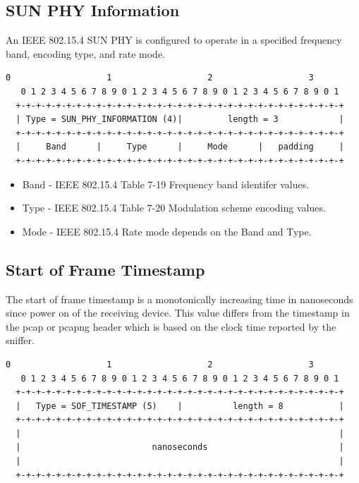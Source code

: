\documentclass[12pt]{article}
\renewcommand\_{\textunderscore\allowbreak}
\begin{document}
\subsection{SUN PHY Information}

An IEEE 802.15.4 SUN PHY is configured to operate in a specified frequency
band, encoding type, and rate mode.

\begin{Verbatim}[samepage=true]
   0                   1                   2                   3
   0 1 2 3 4 5 6 7 8 9 0 1 2 3 4 5 6 7 8 9 0 1 2 3 4 5 6 7 8 9 0 1
  +-+-+-+-+-+-+-+-+-+-+-+-+-+-+-+-+-+-+-+-+-+-+-+-+-+-+-+-+-+-+-+-+
  | Type = SUN_PHY_INFORMATION (4)|         length = 3            |
  +-+-+-+-+-+-+-+-+-+-+-+-+-+-+-+-+-+-+-+-+-+-+-+-+-+-+-+-+-+-+-+-+
  |     Band      |     Type      |     Mode      |   padding     |
  +-+-+-+-+-+-+-+-+-+-+-+-+-+-+-+-+-+-+-+-+-+-+-+-+-+-+-+-+-+-+-+-+
\end{Verbatim}

\begin{itemize}
    \item Band - IEEE 802.15.4 Table 7-19 Frequency band identifer values.
    \item Type - IEEE 802.15.4 Table 7-20 Modulation scheme encoding values.
    \item Mode - IEEE 802.15.4 Rate mode depends on the Band and Type.
\end{itemize}

\newpage
\subsection{Start of Frame Timestamp}

The start of frame timestamp is a monotonically increasing time in nanoseconds
since power on of the receiving device.  This value differs from the timestamp
in the pcap or pcapng header which is based on the clock time reported by the
sniffer.

\begin{Verbatim}[samepage=true]
   0                   1                   2                   3
   0 1 2 3 4 5 6 7 8 9 0 1 2 3 4 5 6 7 8 9 0 1 2 3 4 5 6 7 8 9 0 1
  +-+-+-+-+-+-+-+-+-+-+-+-+-+-+-+-+-+-+-+-+-+-+-+-+-+-+-+-+-+-+-+-+
  |   Type = SOF_TIMESTAMP (5)    |          length = 8           |
  +-+-+-+-+-+-+-+-+-+-+-+-+-+-+-+-+-+-+-+-+-+-+-+-+-+-+-+-+-+-+-+-+
  |                                                               |
  |                          nanoseconds                          |
  |                                                               |
  +-+-+-+-+-+-+-+-+-+-+-+-+-+-+-+-+-+-+-+-+-+-+-+-+-+-+-+-+-+-+-+-+
\end{Verbatim}
\end{document}
